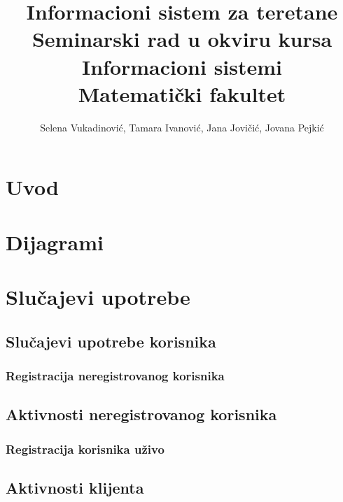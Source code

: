 \documentclass[a4paper]{article}
\begin{document}
\title{Informacioni sistem za teretane\\ \small{Seminarski rad u okviru kursa\\Informacioni sistemi\\ Matematički fakultet}}

\author{Selena Vukadinović, Tamara Ivanović, Jana Jovičić, Jovana Pejkić}


\maketitle
\newpage

\tableofcontents
\newpage

\section{Uvod}
\label{sec:uvod}


\newpage
\section{Dijagrami}


\section{Slučajevi upotrebe}

\subsection{Slučajevi upotrebe korisnika}
\subsubsection{Registracija neregistrovanog korisnika}


\subsection{Aktivnosti neregistrovanog korisnika}
\subsubsection{Registracija korisnika uživo}


\subsection{Aktivnosti klijenta}
\end{document}
